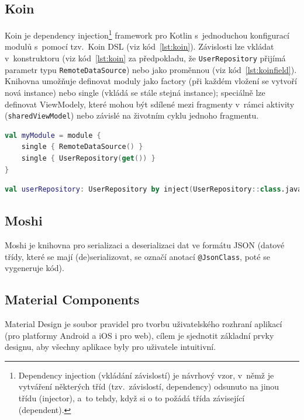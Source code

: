 \documentclass[twoside]{ctuthesis}
\begin{document}
\subsection{Koin}
Koin \cite{koin2020what} je dependency injection\footnote{Dependency injection (vkládání závislostí) je návrhový vzor, v~němž je vytváření některých tříd (tzv.~závislostí, dependency) odsunuto na jinou třídu (injector), a~to tehdy, když si o to požádá třída závisející (dependent). } framework pro Kotlin s~jednoduchou kon\-fi\-gu\-ra\-cí modulů s~pomocí tzv.~Koin DSL (viz kód~\ref{lst:koin}). Závislosti lze vkládat v~kon\-struk\-to\-ru (viz kód~\ref{lst:koin} za předpokladu, že \texttt{UserRepository} přijímá parametr typu \texttt{RemoteDataSource}) nebo jako proměnnou (viz kód~\ref{lst:koinfield}). Knihovna umožňuje definovat moduly jako factory (při každém vložení se vytvoří nová instance) nebo single (vkládá se stále stejná instance); speciálně lze definovat ViewModely, které mohou být sdílené mezi fragmenty v~rámci aktivity (\texttt{sharedViewModel}) nebo závislé na životním cyklu jednoho fragmentu.


\begin{lstlisting}[language=Kotlin,caption={Definice modulů v Koinu},label={lst:koin}]
val myModule = module {
	single { RemoteDataSource() }
	single { UserRepository(get()) }
}
\end{lstlisting}

\begin{lstlisting}[language=Kotlin,caption={Vložení závislosti },label={lst:koinfield}]
val userRepository: UserRepository by inject(UserRepository::class.java)
\end{lstlisting}

\subsection{Moshi}

Moshi \cite{square2021moshi} je knihovna pro serializaci a deserializaci dat ve formátu JSON (datové třídy, které se mají (de)serializovat, se označí anotací \texttt{@JsonClass}, poté se vygeneruje kód).

\subsection{Material Components}
Material Design je soubor pravidel pro tvorbu uživatelského rozhraní aplikací (pro platformy Android a iOS i pro web), cílem je sjednotit základní prvky designu, aby všechny aplikace byly pro uživatele intuitivní. \cite{material2020introduction}
\end{document}

